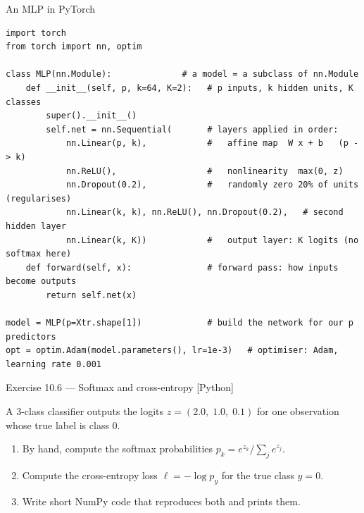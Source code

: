 \documentclass[aspectratio=169,11pt]{beamer}
\begin{document}

\begin{frame}[fragile]{An MLP in PyTorch}
  \begin{lstlisting}
import torch
from torch import nn, optim

class MLP(nn.Module):              # a model = a subclass of nn.Module
    def __init__(self, p, k=64, K=2):   # p inputs, k hidden units, K classes
        super().__init__()
        self.net = nn.Sequential(       # layers applied in order:
            nn.Linear(p, k),            #   affine map  W x + b   (p -> k)
            nn.ReLU(),                  #   nonlinearity  max(0, z)
            nn.Dropout(0.2),            #   randomly zero 20% of units (regularises)
            nn.Linear(k, k), nn.ReLU(), nn.Dropout(0.2),   # second hidden layer
            nn.Linear(k, K))            #   output layer: K logits (no softmax here)
    def forward(self, x):               # forward pass: how inputs become outputs
        return self.net(x)

model = MLP(p=Xtr.shape[1])             # build the network for our p predictors
opt = optim.Adam(model.parameters(), lr=1e-3)   # optimiser: Adam, learning rate 0.001
  \end{lstlisting}
\end{frame}


\begin{frame}[fragile]{Exercise 10.6 --- Softmax and cross-entropy [Python]}
\begin{exercise}
  A 3-class classifier outputs the logits
  $z = (2.0,\; 1.0,\; 0.1)$ for one observation whose true label is
  class $0$.
  \begin{enumerate}
    \item By hand, compute the softmax probabilities
          $p_k = e^{z_k} / \sum_j e^{z_j}$.
    \item Compute the cross-entropy loss
          $\ell = -\log p_{y}$ for the true class $y = 0$.
    \item Write short NumPy code that reproduces both and prints them.
  \end{enumerate}
\end{exercise}
\end{frame}
\end{document}
